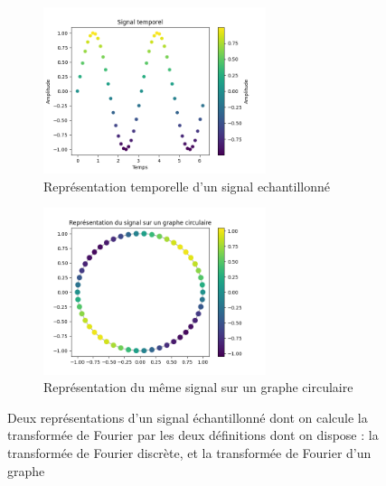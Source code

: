 \documentclass[11pt]{article}
\begin{document}
\begin{figure}[h]
  \centering
  \begin{subfigure}{0.35\linewidth}
    \includegraphics[width=6.5cm]{img/temporal_signal.png}
    \caption{Représentation temporelle d'un signal echantillonné}
    \label{fig:DANN_1}
  \end{subfigure}
  \hspace{1.5cm}
  \begin{subfigure}{0.35\linewidth}
    \includegraphics[width=6.5cm]{img/graph_signal.png}
    \caption{Représentation du même signal sur un graphe circulaire}
    \label{fig:DANN_2}
  \end{subfigure}
  \caption{Deux représentations d'un signal échantillonné dont on calcule la transformée de Fourier par les deux définitions dont on dispose : la transformée de Fourier discrète, et la transformée de Fourier d'un graphe}
  \label{fig:DANN}
\end{figure}
\end{document}
